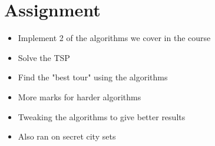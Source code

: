 \documentclass{article}[18pt]
\begin{document}
\section{Assignment}
\begin{itemize}
	\item Implement 2 of the algorithms we cover in the course
	\item Solve the TSP
	\item Find the "best tour" using the algorithms
	\item More marks for harder algorithms
	\item Tweaking the algorithms to give better results
	\item Also ran on secret city sets
\end{itemize}
\end{document}

